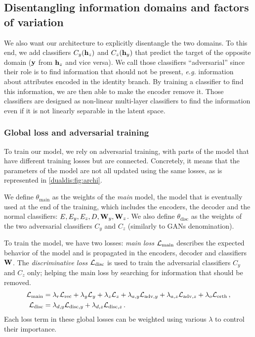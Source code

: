 \subsection{Disentangling information domains and factors of variation}\label{dualdis:sec:model_dis}

We also want our architecture to explicitly disentangle the two domains. To this end, we add classifiers $C_y(\mathbf{h}_z)$ and $C_z(\mathbf{h}_y)$ that predict the target of the opposite domain ($\mathbf{y}$ from $\mathbf{h}_z$ and vice versa). We call those classifiers ``adversarial'' since their role is to find information that should not be present, \textit{e.g.} information about attributes encoded in the identity branch. By training a classifier to find this information, we are then able to make the encoder remove it. Those classifiers are designed as non-linear multi-layer classifiers to find the information even if it is not linearly separable in the latent space.

\subsubsection{Global loss and adversarial training}

To train our model, we rely on adversarial training, with parts of the model that have different training losses but are connected. Concretely, it means that the parameters of the model are not all updated using the same losses, as is represented in \autoref{dualdis:fig:archi}.

We define $\theta_\mathrm{main}$ as the weights of the \textit{main} model, \ie the model that is eventually used at the end of the training, which includes the encoders, the decoder and the normal classifiers: $E,E_y,E_z,D,\mathbf{W}_y,\mathbf{W}_z$. We also define $\theta_\mathrm{disc}$ as the weights of the two adversarial classifiers $C_y$ and $C_z$ (similarly to \acp{GAN} denomination).

To train the model, we have two losses: \textit{main loss} $\mathcal{L}_\mathrm{main}$ describes the expected behavior of the model and is propagated in the encoders, decoder and classifiers $\mathbf{W}$. The \textit{discriminative loss} $\mathcal{L}_\textrm{disc}$ is used to train the adversarial classifiers $C_y$ and $C_z$ only; helping the main loss by searching for information that should be removed.
\begin{align}
    \mathcal{L}_\mathrm{main} &= \lambda_r \mathcal{L}_\textrm{rec} + \lambda_y \mathcal{L}_{y} + \lambda_z \mathcal{L}_{z} + \lambda_{a,y} \mathcal{L}_{\textrm{adv},y} + \lambda_{a,z} \mathcal{L}_{\textrm{adv},z} + \lambda_{o} \mathcal{L}_\textrm{orth}\,,\\
    \mathcal{L}_\mathrm{disc} &= \lambda_{d,y} \mathcal{L}_{\textrm{disc},y} + \lambda_{d,z} \mathcal{L}_{\textrm{disc},z}\,.
\end{align}
Each loss term in these global losses can be weighted using various $\lambda$ to control their importance.

